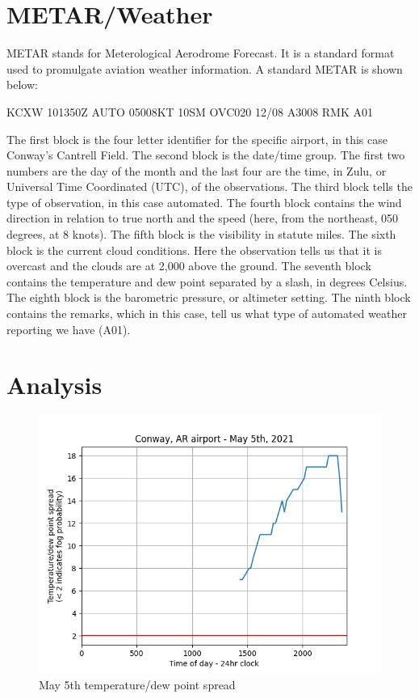 \documentclass{article}
\begin{document}
\section{METAR/Weather}
METAR stands for Meterological Aerodrome Forecast. It is a standard format used to promulgate aviation weather information. A standard METAR is shown below:
\medskip
\begin{center}
KCXW 101350Z AUTO 05008KT 10SM OVC020 12/08 A3008 RMK A01
\end{center}
\medskip
The first block is the four letter identifier for the specific airport, in this case Conway's Cantrell Field. The second block is the date/time group. The first two numbers are the day of the month and the last four are the time, in Zulu, or Universal Time Coordinated (UTC), of the observations. The third block tells the type of observation, in this case automated. The fourth block contains the wind direction in relation to true north and the speed (here, from the northeast, 050 degrees, at 8 knots). The fifth block is the visibility in statute miles. The sixth block is the current cloud conditions. Here the observation tells us that it is overcast and the clouds are at 2,000 above the ground. The seventh block contains the temperature and dew point separated by a slash, in degrees Celsius. The eighth block is the barometric pressure, or altimeter setting. The ninth block contains the remarks, which in this case, tell us what type of automated weather reporting we have (A01). 

\section{Analysis}

\begin{figure}[h]
\begin{center}
\includegraphics[width=1\textwidth]{May5th.png}
\end{center}
\caption{May 5th temperature/dew point spread}
\label{May 5th}
\end{figure}
\end{document}
